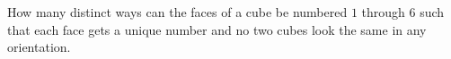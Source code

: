 
%
%
%
%
% 
% 

\question[4] How many distinct ways can the faces of a cube be numbered $1$ through $6$ such that each face gets a unique number and no two cubes look the same in any orientation.


\ifprintanswers
\fi 

